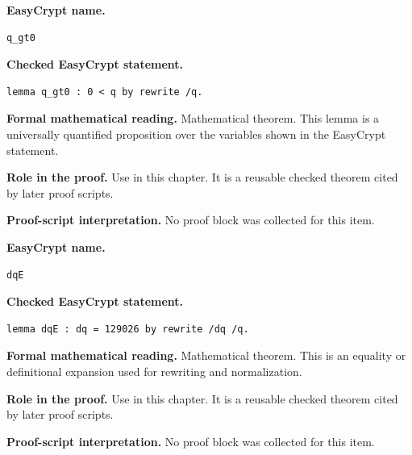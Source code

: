 \begin{formaltheorem}
\noindent\textbf{EasyCrypt name.}
\begin{lstlisting}[language=EasyCrypt,basicstyle=\ttfamily\scriptsize]
q_gt0
\end{lstlisting}
\noindent\textbf{Checked EasyCrypt statement.}
\begin{lstlisting}[language=EasyCrypt,basicstyle=\ttfamily\scriptsize]
lemma q_gt0 : 0 < q by rewrite /q.
\end{lstlisting}
\noindent\textbf{Formal mathematical reading.}
Mathematical theorem. This lemma is a universally quantified proposition over the variables shown in the EasyCrypt statement.

\noindent\textbf{Role in the proof.}
Use in this chapter. It is a reusable checked theorem cited by later proof scripts.

\noindent\textbf{Proof-script interpretation.}
No proof block was collected for this item.

\end{formaltheorem}

\begin{formaltheorem}
\noindent\textbf{EasyCrypt name.}
\begin{lstlisting}[language=EasyCrypt,basicstyle=\ttfamily\scriptsize]
dqE
\end{lstlisting}
\noindent\textbf{Checked EasyCrypt statement.}
\begin{lstlisting}[language=EasyCrypt,basicstyle=\ttfamily\scriptsize]
lemma dqE : dq = 129026 by rewrite /dq /q.
\end{lstlisting}
\noindent\textbf{Formal mathematical reading.}
Mathematical theorem. This is an equality or definitional expansion used for rewriting and normalization.

\noindent\textbf{Role in the proof.}
Use in this chapter. It is a reusable checked theorem cited by later proof scripts.

\noindent\textbf{Proof-script interpretation.}
No proof block was collected for this item.

\end{formaltheorem}

